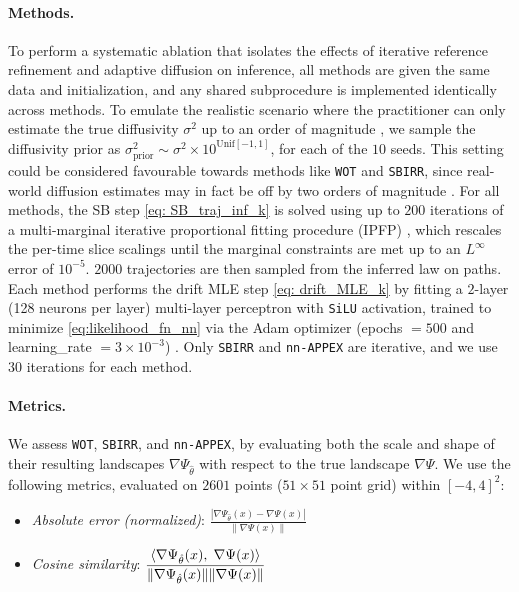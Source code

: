 \documentclass[twoside]{article}
\newcommand{\nappex}{\texttt{nn-APPEX}}
\newcommand{\wot}{\texttt{WOT}}
\newcommand{\sbirr}{\texttt{SBIRR}}
\begin{document}
\paragraph{Methods.} 
To perform a systematic ablation that isolates the effects of iterative reference refinement and adaptive diffusion on inference, all methods are given the same data and initialization, and any shared subprocedure is implemented identically across methods. To emulate the realistic scenario where the practitioner can only estimate the true diffusivity $\sigma^2$ up to an order of magnitude \citep{guan2024identifying}, we sample the diffusivity prior as $\sigma^2_{\text{prior}} \sim \sigma^2 \times 10^{\textrm{Unif}[-1,1]}$, for each of the $10$ seeds. This setting could be considered favourable towards methods like \wot{} and \sbirr{}, since real-world diffusion estimates may in fact be off by two orders of magnitude \citep{forrow2024consistent}. For all methods, the SB step \eqref{eq: SB_traj_inf_k} is solved using up to $200$ iterations of a multi-marginal iterative proportional fitting procedure (IPFP) \citep[Section 4.3]{marino2020optimal}, which rescales the per-time slice scalings until the marginal constraints are met up to an $L^\infty$ error of $10^{-5}$. $2000$ trajectories are then sampled from the inferred law on paths. Each method performs the drift MLE step \eqref{eq: drift_MLE_k} by fitting a $2$-layer (128 neurons per layer) multi-layer perceptron with \texttt{SiLU} activation, trained to minimize \eqref{eq:likelihood_fn_nn} via the Adam optimizer (epochs $=500$ and learning\_rate $=3 \times 10^{-3}$) \citep{kingma2014adam}. Only \sbirr{} and \nappex{} are iterative, and we use $30$ iterations for each method.



\vspace{-1em}
\paragraph{Metrics.}
We assess \wot, \sbirr, and \nappex, by evaluating both the scale and shape of their resulting landscapes $\nabla \Psi_{\hat{\theta}}$ with respect to the true landscape $\nabla \Psi$. We use the following metrics, evaluated on $2601$ points ($51 \times 51$ point grid) within $[-4,4]^2$: 
\begin{itemize}[leftmargin=*, nosep]
\item \emph{Absolute error (normalized)}: $\displaystyle \frac{|\nabla \Psi_{\hat{\theta}}(x)-\nabla \Psi(x)|}{\|\nabla \Psi(x)\|}$
\item \emph{Cosine similarity}: $\displaystyle \frac{\langle \nabla\Psi_{\hat{\theta}}(x), \hspace{0.1cm}\nabla \Psi(x) \rangle }{\|\nabla\Psi_{\hat{\theta}}(x)\| \|\nabla \Psi(x)\|}$
\end{itemize}
\end{document}
